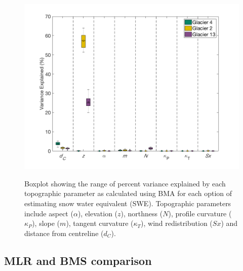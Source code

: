 \documentclass[12pt]{article}
\begin{document}
\begin{figure}[H]
	\centering
	\includegraphics[width =1.1 \textwidth]{BMSCoeffs_DensityOpts.png}\\
	\caption{Boxplot showing the range of percent variance explained by each topographic parameter as calculated using BMA for each option of estimating snow water equivalent (SWE). Topographic parameters include aspect ($\alpha$), elevation ($z$), northness ($N$), profile curvature ($\kappa_P$), slope ($m$), tangent curvature ($\kappa_T$), wind redistribution ($Sx$) and distance from centreline ($d_C$).}
	\label{fig:BMSPercentVar_densityOptions}
\end{figure} 



\subsection{MLR and BMS comparison}
\end{document}
